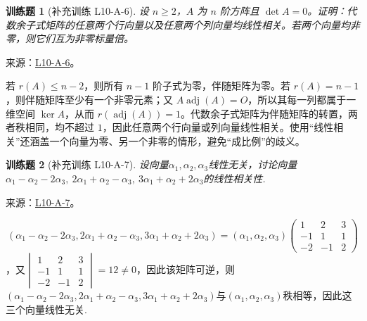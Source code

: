 \documentclass[UTF8,12pt,a4paper,fontset=fandol]{ctexart}
\newtheorem{exercise}{训练题}[section]
\begin{document}
\begin{exercise}[补充训练 L10-A-6]\label{prob:L10-A-6}
设 $n\ge2$，$A$ 为 $n$ 阶方阵且 $\det A=0$。证明：代数余子式矩阵的任意两个行向量以及任意两个列向量均线性相关。若两个向量均非零，则它们互为非零标量倍。
\end{exercise}
\noindent 来源：\href{https://github.com/yhwu-is/Linear-Algebra-Left-Undone/blob/new/%E8%AE%B2%E4%B9%89/%E4%B8%93%E9%A2%98/10%20%E8%A1%8C%E5%88%97%E5%BC%8F.tex}{L10-A-6}。
\begin{solve}
若 $r(A)\le n-2$，则所有 $n-1$ 阶子式为零，伴随矩阵为零。若 $r(A)=n-1$，则伴随矩阵至少有一个非零元素；又 $A\operatorname{adj}(A)=O$，所以其每一列都属于一维空间 $\ker A$，从而 $r(\operatorname{adj}(A))=1$。代数余子式矩阵为伴随矩阵的转置，两者秩相同，均不超过 $1$，因此任意两个行向量或列向量线性相关。使用“线性相关”还涵盖一个向量为零、另一个非零的情形，避免“成比例”的歧义。
\end{solve}

\begin{exercise}[补充训练 L10-A-7]\label{prob:L10-A-7}
设向量$\alpha_1,\alpha_2,\alpha_3$线性无关，讨论向量$\alpha_1-\alpha_2-2\alpha_3,\ 2\alpha_1+\alpha_2-\alpha_3,\ 3\alpha_1+\alpha_2+2\alpha_3$的线性相关性.
\end{exercise}
\noindent 来源：\href{https://github.com/yhwu-is/Linear-Algebra-Left-Undone/blob/new/%E8%AE%B2%E4%B9%89/%E4%B8%93%E9%A2%98/10%20%E8%A1%8C%E5%88%97%E5%BC%8F.tex}{L10-A-7}。
\begin{solve}
\[(\alpha_1-\alpha_2-2\alpha_3,2\alpha_1+\alpha_2-\alpha_3,3\alpha_1+\alpha_2+2\alpha_3)=(\alpha_1,\alpha_2,\alpha_3)\begin{pmatrix}
                1 & 2 & 3 \\ -1 & 1 & 1 \\ -2 & -1 & 2
            \end{pmatrix}\]
，又$\begin{vmatrix}
                1 & 2 & 3 \\ -1 & 1 & 1 \\ -2 & -1 & 2
            \end{vmatrix}=12\neq 0$，因此该矩阵可逆，则$(\alpha_1-\alpha_2-2\alpha_3,2\alpha_1+\alpha_2-\alpha_3,3\alpha_1+\alpha_2+2\alpha_3)$与$(\alpha_1,\alpha_2,\alpha_3)$秩相等，因此这三个向量线性无关.
\end{solve}
\end{document}
